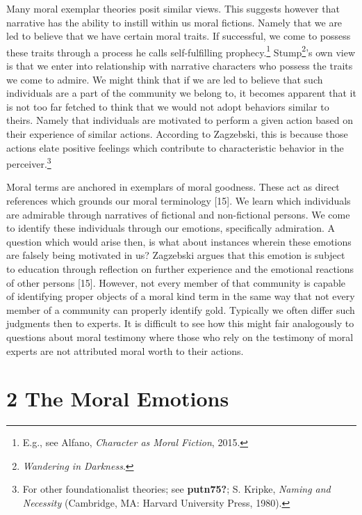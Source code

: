 \documentclass[phdthesis,12pt,final]{wuthesis}
\theoremstyle{definition}
\theoremstyle{definition}
\theoremstyle{definition}
\theoremstyle{definition}
\theoremstyle{remark}
\begin{document}
Many moral exemplar theories posit similar views. This suggests however that narrative has the ability to instill within us moral fictions. Namely that we are led to believe that we have certain moral traits. If successful, we come to possess these traits through a process he calls self-fulfilling prophecy.\footnote{E.g., see Alfano, \emph{Character as Moral Fiction}, 2015.} Stump\footnote{\emph{Wandering in {Darkness}}.}'s own view is that we enter into relationship with narrative characters who possess the traits we come to admire. We might think that if we are led to believe that such individuals are a part of the community we belong to, it becomes apparent that it is not too far fetched to think that we would not adopt behaviors similar to theirs. Namely that individuals are motivated to perform a given action based on their experience of similar actions. According to Zagzebski, this is because those actions elate positive feelings which contribute to characteristic behavior in the perceiver.\footnote{For other foundationalist theories; see \textbf{putn75?}; S. Kripke, \emph{Naming and Necessity} (Cambridge, MA: Harvard University Press, 1980).}

Moral terms are anchored in exemplars of moral goodness. These act as direct references which grounds our moral terminology {[}15{]}. We learn which individuals are admirable through narratives of fictional and non-fictional persons. We come to identify these individuals through our emotions, specifically admiration. A question which would arise then, is what about instances wherein these emotions are falsely being motivated in us? Zagzebski argues that this emotion is subject to education through reflection on further experience and the emotional reactions of other persons {[}15{]}. However, not every member of that community is capable of identifying proper objects of a moral kind term in the same way that not every member of a community can properly identify gold. Typically we often differ such judgments then to experts. It is difficult to see how this might fair analogously to questions about moral testimony where those who rely on the testimony of moral experts are not attributed moral worth to their actions.

\section{2 The Moral Emotions}\label{the-moral-emotions}
\end{document}
